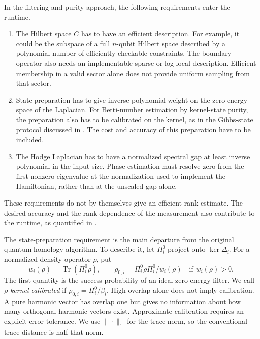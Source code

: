 \documentclass[a4paper,onecolumn,unpublished]{quantumarticle}
\theoremstyle{plain}
\theoremstyle{definition}
\theoremstyle{definition}
\numberwithin{equation}{section}
\begin{document}
In the filtering-and-purity approach, the following requirements enter the runtime.
\begin{enumerate}
    \item The Hilbert space \(C\) has to have an efficient description. For example, it could be the subspace of a full \(n\)-qubit Hilbert space described by a polynomial number of efficiently checkable constraints. The boundary operator also needs an implementable sparse or log-local description. Efficient membership in a valid sector alone does not provide uniform sampling from that sector.
    \item State preparation has to give inverse-polynomial weight on the zero-energy space of the Laplacian. For Betti-number estimation by kernel-state purity, the preparation also has to be calibrated on the kernel, as in the Gibbs-state protocol discussed in . The cost and accuracy of this preparation have to be included.
    \item The Hodge Laplacian has to have a normalized spectral gap at least inverse polynomial in the input size. Phase estimation must resolve zero from the first nonzero eigenvalue at the normalization used to implement the Hamiltonian, rather than at the unscaled gap alone.
\end{enumerate}
These requirements do not by themselves give an efficient rank estimate. The desired accuracy and the rank dependence of the measurement also contribute to the runtime, as quantified in .

The state-preparation requirement is the main departure from the original quantum homology algorithm. To describe it, let \(\Pi_i^0\) project onto \(\ker\Delta_i\). For a normalized density operator \(\rho\), put
\[
 w_i(\rho)=\operatorname{Tr}(\Pi_i^0\rho),\qquad
 \rho_{0,i}=\Pi_i^0\rho\Pi_i^0/w_i(\rho)
 \quad\text{if }w_i(\rho)>0.
\]
The first quantity is the success probability of an ideal zero-energy filter. We call \(\rho\) \emph{kernel-calibrated} if \(\rho_{0,i}=\Pi_i^0/\beta_i\). High overlap alone does not imply calibration. A pure harmonic vector has overlap one but gives no information about how many orthogonal harmonic vectors exist. Approximate calibration requires an explicit error tolerance. We use \(\|\cdot\|_1\) for the trace norm, so the conventional trace distance is half that norm.
\end{document}
